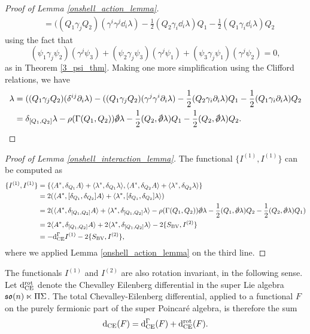 \documentclass[10pt, oneside]{article}
\begin{document}
\begin{proof}[Proof of Lemma \ref{onshell_action_lemma}]
\begin{align*}
&= ((Q_1 \gamma_j Q_2) (\gamma^i \gamma^j \dd_i \lambda) - \frac 12(Q_2 \gamma_i \dd_i \lambda)Q_1 - \frac 12(Q_1 \gamma_i \dd_i \lambda)Q_2
\end{align*}
using the fact that 
\[(\psi_1 \gamma_j \psi_2)(\gamma^j \psi_3) + (\psi_2 \gamma_j \psi_3)(\gamma^j \psi_1) + (\psi_3 \gamma_j \psi_1)(\gamma^j \psi_2) = 0,\]
as in Theorem \ref{3_psi_thm}.  Making one more simplification using the Clifford relations, we have
\begin{align*}
[\delta_{Q_1}, \delta_{Q_2}] \lambda &= ((Q_1 \gamma_j Q_2) (\delta^{ij} \dd_i \lambda) - ((Q_1 \gamma_j Q_2) (\gamma^j \gamma^i \dd_i \lambda) - \frac 12(Q_2 \gamma_i \dd_i \lambda)Q_1 - \frac 12(Q_1 \gamma_i \dd_i \lambda)Q_2 \\
&= \delta_{[Q_1,Q_2]} \lambda - \rho(\Gamma(Q_1,Q_2)) \sd \dd \lambda - \frac 12(Q_2, \sd \dd \lambda)Q_1 - \frac 12(Q_2, \sd \dd \lambda)Q_2.
\end{align*}
\end{proof}

\begin{proof}[Proof of Lemma \ref{onshell_interaction_lemma}]
The functional $\{I^{(1)},I^{(1)}\}$ can be computed as 
\begin{align*}
\{I^{(1)},I^{(1)}\} &= \{\<A^* , \delta_{Q_1} A\> + \<\lambda^*, \delta_{Q_1} \lambda\>, \<A^* , \delta_{Q_2} A\> + \<\lambda^*, \delta_{Q_2} \lambda\> \} \\
&= 2(\langle A^*, [\delta_{Q_1}, \delta_{Q_2}] A \rangle + \langle \lambda^*, [\delta_{Q_1}, \delta_{Q_2}] \lambda \rangle) \\
 &= 2(\langle A^*, \delta_{[Q_1,Q_2]} A \rangle + \langle \lambda^*, \delta_{[Q_1,Q_2]} \lambda \rangle  - \rho(\Gamma(Q_1,Q_2)) \sd \dd \lambda - \frac 12(Q_1, \sd \dd \lambda)Q_2 - \frac 12(Q_2, \sd \dd \lambda)Q_1) \\
 &= 2\langle A^*, \delta_{[Q_1,Q_2]} A \rangle + 2\langle \lambda^*, \delta_{[Q_1,Q_2]} \lambda \rangle - 2\{S_{\mr{BV}} , I^{(2)}\} \\
 &= - \d_{\mr{CE}}^\Gamma I^{(1)} -2\{S_{\mr{BV}} , I^{(2)}\},
\end{align*}
where we applied Lemma \ref{onshell_action_lemma} on the third line. 
\end{proof}

The functionals $I^{(1)}$ and $I^{(2)}$ are also rotation invariant, in the following sense.  Let ${\rm d}^{\mathrm{rot}}_{\mathrm{CE}}$ denote the Chevalley Eilenberg differential in the super Lie algebra $\mathfrak{so}(n) \ltimes \Pi \Sigma$.  The total Chevalley-Eilenberg differential, applied to a functional $F$ on the purely fermionic part of the super Poincar\'e algebra, is therefore the sum
\[{\rm d}_{\mathrm{CE}}(F) = {\rm d}^\Gamma_{\mathrm{CE}}(F) + {\rm d}^{\mathrm{rot}}_{\mathrm{CE}}(F).\]
\end{document}
